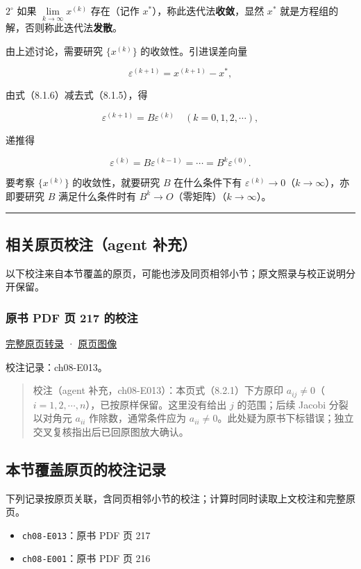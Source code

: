 \documentclass[
  10pt,
  fontset=fandol]{ctexart}
\providecommand{\tightlist}{%
  \setlength{\itemsep}{0pt}\setlength{\parskip}{0pt}}
\begin{document}
\(2^\circ\) 如果 \(\lim\limits_{k\to\infty}x^{(k)}\) 存在（记作 \(x^*\)），称此迭代法\textbf{收敛}，显然 \(x^*\) 就是方程组的解，否则称此迭代法\textbf{发散}。

由上述讨论，需要研究 \(\{x^{(k)}\}\) 的收敛性。引进误差向量

\[
\varepsilon^{(k+1)}=x^{(k+1)}-x^*,
\]

由式（8.1.6）减去式（8.1.5），得

\[
\varepsilon^{(k+1)}=B\varepsilon^{(k)}\quad(k=0,1,2,\cdots),
\]

递推得

\[
\varepsilon^{(k)}=B\varepsilon^{(k-1)}=\cdots=B^k\varepsilon^{(0)}.
\]

要考察 \(\{x^{(k)}\}\) 的收敛性，就要研究 \(B\) 在什么条件下有 \(\varepsilon^{(k)}\to0\)（\(k\to\infty\)），亦即要研究 \(B\) 满足什么条件时有 \(B^k\to O\)（零矩阵）（\(k\to\infty\)）。

\begin{center}\rule{0.5\linewidth}{0.5pt}\end{center}

\subsection{相关原页校注（agent 补充）}\label{ux76f8ux5173ux539fux9875ux6821ux6ce8agent-ux8865ux5145}

以下校注来自本节覆盖的原页，可能也涉及同页相邻小节；原文照录与校正说明分开保留。

\subsubsection{原书 PDF 页 217 的校注}\label{ux539fux4e66-pdf-ux9875-217-ux7684ux6821ux6ce8}

\href{../pages/pdf-217.md}{完整原页转录} · \href{../../source-images/pdf-217.jpeg}{原页图像}

校注记录：ch08-E013。

\begin{quote}
校注（agent 补充，ch08-E013）：本页式（8.2.1）下方原印 \(a_{ij}\neq0\)（\(i=1,2,\cdots,n\)），已按原样保留。这里没有给出 \(j\) 的范围；后续 Jacobi 分裂以对角元 \(a_{ii}\) 作除数，通常条件应为 \(a_{ii}\neq0\)。此处疑为原书下标错误；独立交叉复核指出后已回原图放大确认。
\end{quote}

\subsection{本节覆盖原页的校注记录}\label{ux672cux8282ux8986ux76d6ux539fux9875ux7684ux6821ux6ce8ux8bb0ux5f55}

下列记录按原页关联，含同页相邻小节的校注；计算时同时读取上文校注和完整原页。

\begin{itemize}
\tightlist
\item
  \texttt{ch08-E013}：原书 PDF 页 217
\item
  \texttt{ch08-E001}：原书 PDF 页 216
\end{itemize}
\end{document}
